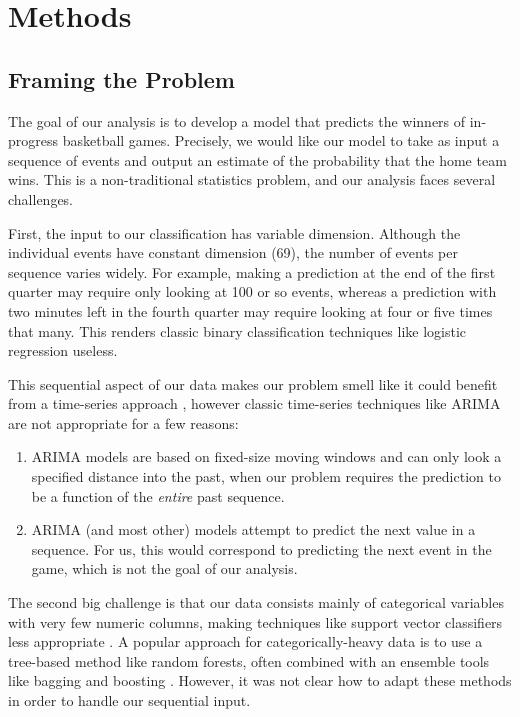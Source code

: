 \section{Methods}
\label{sec:methods}

\subsection{Framing the Problem}

The goal of our analysis is to develop a model that predicts the winners of in-progress basketball games. Precisely, we would like our model to take as input a sequence of events and output an estimate of the probability that the home team wins. This is a non-traditional statistics problem, and our analysis faces several challenges.

First, the input to our classification has variable dimension. Although the individual events have constant dimension (69), the number of events per sequence varies widely. For example, making a prediction at the end of the first quarter may require only looking at 100 or so events, whereas a prediction with two minutes left in the fourth quarter may require looking at four or five times that many. This renders classic binary classification techniques like logistic regression useless.

This sequential aspect of our data makes our problem smell like it could benefit from a time-series approach \cite[ch. 4, 5]{TSA}, however classic time-series techniques like ARIMA are not appropriate for a few reasons:
\begin{enumerate}
	\item ARIMA models are based on fixed-size moving windows and can only look a specified distance into the past, when our problem requires the prediction to be a function of the \emph{entire} past sequence.
	\item ARIMA (and most other) models attempt to predict the next value in a sequence. For us, this would correspond to predicting the next event in the game, which is not the goal of our analysis.
\end{enumerate}

The second big challenge is that our data consists mainly of categorical variables with very few numeric columns, making techniques like support vector classifiers less appropriate \cite[\S 9]{ISL}. A popular approach for categorically-heavy data is to use a tree-based method like random forests, often combined with an ensemble tools like bagging and boosting \cite[\S 9, \S 10]{ESL}. However, it was not clear how to adapt these methods in order to handle our sequential input.


